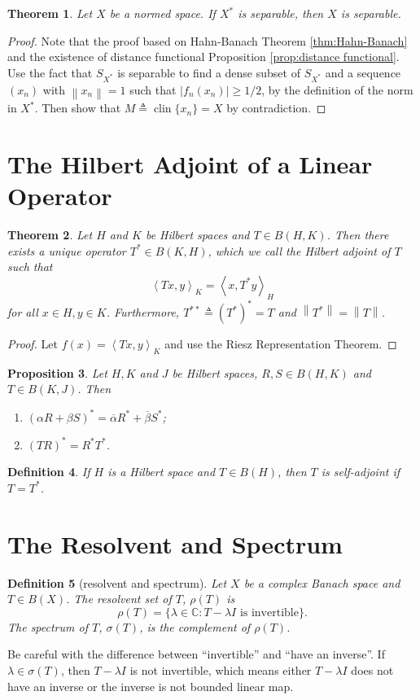 \documentclass[12pt,a4paper]{report}
\numberwithin{equation}{section}
\theoremstyle{mystyle}
\newtheorem{definition}{Definition}[section]
\newtheorem{theorem}[definition]{Theorem}
\newtheorem{proposition}[definition]{Proposition}
\newcommand{\C}{\mathbb{C}}
\newcommand{\norm}[1]{\left\lVert #1 \right\rVert}
\newcommand{\inner}[1]{\left\langle #1 \right\rangle}
\newcommand{\clin}{\operatorname{clin}}
\begin{document}
	\begin{theorem}\label{thm:separable of X*}
		Let $X$ be a normed space. If $X^*$ is separable, then $X$ is separable.
	\end{theorem}
	\begin{proof}
		Note that the proof based on Hahn-Banach Theorem \ref{thm:Hahn-Banach} and the existence of distance functional Proposition \ref{prop:distance functional}. Use the fact that $S_{X^*}$ is separable to find  a dense subset of $S_{X^*}$ and a sequence $(x_n)$ with $\norm{x_n}=1$ such that $|f_n(x_n)|\geq 1/2$, by the definition of the norm in $X^*$. Then show that $M\triangleq\clin\{x_n\}=X$ by contradiction.
	\end{proof}
	
	
	
	\section{The Hilbert Adjoint of a Linear Operator}
	\begin{theorem}
		Let $H$ and $K$ be Hilbert spaces and $T\in B(H,K)$. Then there exists a unique operator $T^*\in B(K,H)$, which we call the \emph{Hilbert adjoint of $T$} such that
		$$
		\inner{Tx,y}_K = \inner{x,T^* y}_H
		$$
		for all $x\in H, y\in K$. Furthermore, $T^{**}\triangleq (T^*)^* = T$ and $\norm{T^*}=\norm{T}$.
	\end{theorem}
	\begin{proof}
		Let $f(x)=\inner{Tx,y}_K$ and use the Riesz Representation Theorem.
	\end{proof}
	
	\begin{proposition}
		Let $H,K$ and $J$ be Hilbert spaces, $R,S\in B(H,K)$ and $T\in B(K,J)$. Then
		\begin{enumerate}
			\item $(\alpha R+\beta S)^* = \overline{\alpha} R^* + \overline{\beta} S^*$;
			\item $(TR)^* = R^* T^*$.
		\end{enumerate}
	\end{proposition}

	\begin{definition}
		If $H$ is a Hilbert space and $T\in B(H)$, then $T$ is \emph{self-adjoint} if $T=T^*$.
	\end{definition}
	
	
	
	
	\section{The Resolvent and Spectrum}
	\begin{definition}[resolvent and spectrum]
		Let $X$ be a complex Banach space and $T\in B(X)$. The \emph{resolvent set} of $T$, $\rho(T)$ is
		$$
		\rho(T)=\{\lambda\in \C: T-\lambda I \text{ is invertible}\}.
		$$
		The \emph{spectrum} of $T$, $\sigma(T)$, is the complement of $\rho(T)$.
	\end{definition}
	Be careful with the difference between ``invertible'' and ``have an inverse''. If $\lambda \in \sigma(T)$, then $T-\lambda I$ is not invertible, which means either $T-\lambda I$ does not have an inverse or the inverse is not bounded linear map.
	
\end{document}
